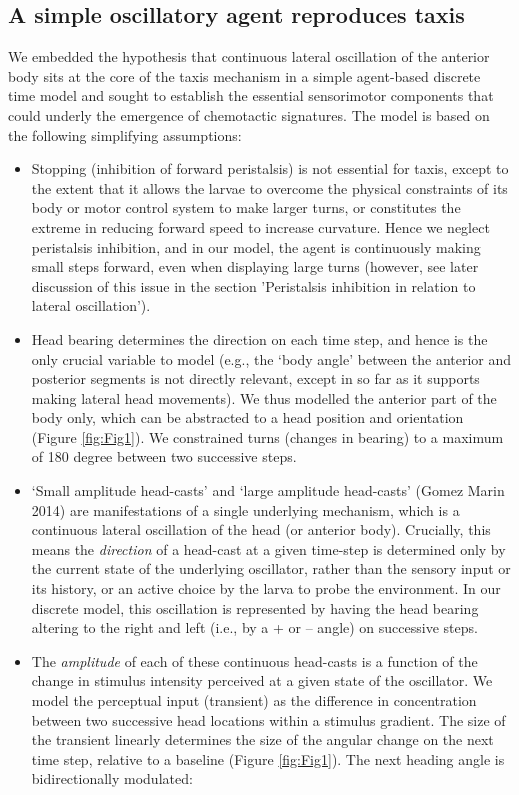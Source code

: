 \documentclass[10pt,a4paper]{article}
\begin{document}
\subsection{A simple oscillatory agent reproduces taxis}
We embedded the hypothesis that continuous lateral oscillation of the anterior body sits at the core of the taxis mechanism in a simple agent-based discrete time model and sought to establish the essential sensorimotor components that could underly the emergence of chemotactic signatures. The model is based on the following simplifying assumptions:
\begin{itemize}
\item Stopping (inhibition of forward peristalsis) is not essential for taxis, except to the extent that it allows the larvae to overcome the physical constraints of its body or motor control system to make larger turns, or constitutes the extreme in reducing forward speed to increase curvature. Hence we neglect peristalsis inhibition, and in our model, the agent is continuously making small steps forward, even when displaying large turns (however, see later discussion of this issue in the section 'Peristalsis inhibition in relation to lateral oscillation').
\item Head bearing determines the direction on each time step, and hence is the only crucial variable to model (e.g., the ‘body angle’ between the anterior and posterior segments is not directly relevant, except in so far as it supports making lateral head movements). We thus modelled the anterior part of the body only, which can be abstracted to a head position and orientation (Figure \ref{fig:Fig1}). We constrained turns (changes in bearing) to a maximum of 180 degree between two successive steps.
\item ‘Small amplitude head-casts’ and ‘large amplitude head-casts’ (Gomez Marin 2014) are manifestations of a single underlying mechanism, which is a continuous lateral oscillation of the head (or anterior body). Crucially, this means the {\it direction} of a head-cast at a given time-step is determined only by the current state of the underlying oscillator, rather than the sensory input or its history, or an active choice by the larva to probe the environment. In our discrete model, this oscillation is represented by having the head bearing altering to the right and left (i.e., by a + or – angle) on successive steps. 
\item The {\it amplitude} of each of these continuous head-casts is a function of the change in stimulus intensity perceived at a given state of the oscillator. We model the perceptual input (transient) as the difference in concentration between two successive head locations within a stimulus gradient. The size of the transient linearly determines the size of the angular change on the next time step, relative to a baseline (Figure \ref{fig:Fig1}). The next heading angle is bidirectionally modulated:

\end{itemize}
\end{document}
